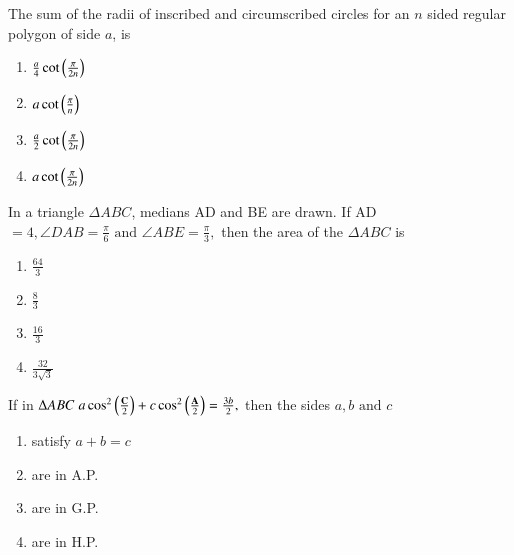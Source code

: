 \iffalse
\title{Sequence and Series}
\author{DHAWAL-ee24btech11015}
\section{mains}
\fi

        \item The sum of the radii of inscribed and circumscribed circles for an $n$ sided regular polygon of side $a$, is \hfill{}
\begin{multicols}{4}
\begin{enumerate}
        \item $\frac{a}{4} \cot{\ensuremath{\left(\frac{\pi}{2n}\right)}}$         
        \item $ a \cot{\ensuremath{\left(\frac{\pi}{n}\right)}}$ 
        \item $\frac{a}{2} \cot{\ensuremath{\left(\frac{\pi}{2n}\right)}}$ 
        \item $ a \cot{\ensuremath{\left(\frac{\pi}{2n}\right)}}$
\end{enumerate}
\end{multicols}

\item In a triangle $\Delta{ABC}$, medians AD and BE are drawn. If AD$=4,\angle{DAB}=\frac{\pi}{6} \text{ and } \angle{ABE}=\frac{\pi}{3},$ then the area of the $\Delta{ABC}$ is \hfill{}
\begin{multicols}{4}
\begin{enumerate}
        \item $\frac{64}{3}$                    
        \item $\frac{8}{3}$ 
        \item $\frac{16}{3}$ 
        \item $\frac{32}{3\sqrt{3}}$
\end{enumerate}
\end{multicols} 

\item If in $\Delta{ABC}\;a\cos^2\left(\frac{\mathbf{C}}{2}\right) + c\cos^2\left(\frac{\mathbf{A}}{2}\right) = \frac{3b}{2},$ then the sides $a,b\text{ and }c$ \hfill{}
\begin{multicols}{4}
\begin{enumerate}
        \item satisfy $a+b=c$                    
        \item are in A.P. 
        \item are in G.P. 
        \item are in H.P.
\end{enumerate}
\end{multicols} 

